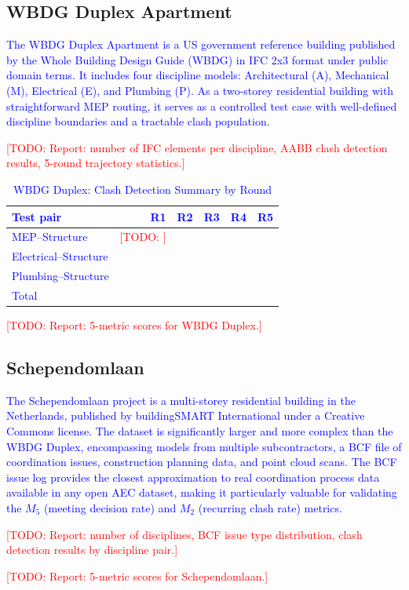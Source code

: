 \documentclass[conference]{IEEEtran}
\newcommand{\todo}[1]{\textcolor{red}{[TODO: #1]}}
\newcommand{\placeholder}[1]{\textcolor{blue}{#1}}
\begin{document}
\subsection{WBDG Duplex Apartment}
\placeholder{
The WBDG Duplex Apartment is a US government reference building published by the Whole Building Design Guide (WBDG) in IFC 2x3 format under public domain terms. It includes four discipline models: Architectural (A), Mechanical (M), Electrical (E), and Plumbing (P). As a two-storey residential building with straightforward MEP routing, it serves as a controlled test case with well-defined discipline boundaries and a tractable clash population.

\todo{Report: number of IFC elements per discipline, AABB clash detection results, 5-round trajectory statistics.}

\begin{table}[htbp]
    \centering
    \caption{WBDG Duplex: Clash Detection Summary by Round}
    \label{tab:wbdg-clashes}
    \begin{tabular}{lrrrrr}
        \toprule
        Test pair & R1 & R2 & R3 & R4 & R5 \\
        \midrule
        MEP--Structure     & \todo{} & & & & \\
        Electrical--Structure & & & & & \\
        Plumbing--Structure   & & & & & \\
        \midrule
        Total              & & & & & \\
        \bottomrule
    \end{tabular}
\end{table}

\todo{Report: 5-metric scores for WBDG Duplex.}
}

\subsection{Schependomlaan}
\placeholder{
The Schependomlaan project is a multi-storey residential building in the Netherlands, published by buildingSMART International under a Creative Commons license. The dataset is significantly larger and more complex than the WBDG Duplex, encompassing models from multiple subcontractors, a BCF file of coordination issues, construction planning data, and point cloud scans. The BCF issue log provides the closest approximation to real coordination process data available in any open AEC dataset, making it particularly valuable for validating the $M_5$ (meeting decision rate) and $M_2$ (recurring clash rate) metrics.

\todo{Report: number of disciplines, BCF issue type distribution, clash detection results by discipline pair.}

\todo{Report: 5-metric scores for Schependomlaan.}
}
\end{document}
